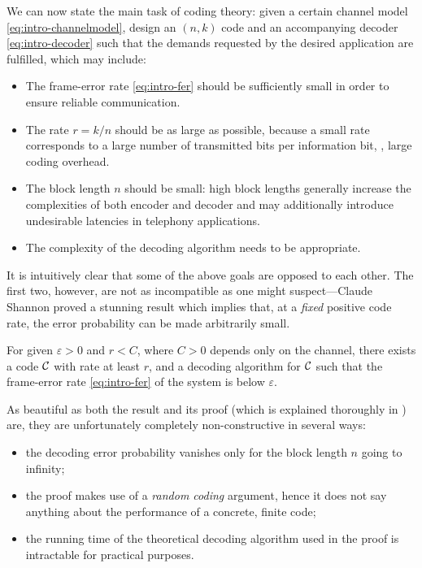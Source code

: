 We can now state the main task of coding theory: given a certain channel model \cref{eq:intro-channelmodel}, design an $(n, k)$ code and an accompanying decoder \cref{eq:intro-decoder} such that the demands requested by the desired application are fulfilled, which may include:
\begin{itemize}
  \item The frame-error rate \cref{eq:intro-fer} should be sufficiently small in order to ensure reliable communication.
  \item The rate $r = k/n$ should be as large as possible, because a small rate corresponds to a large number of transmitted bits per information bit, \ie, large coding overhead.
  \item The block length $n$ should be small: high block lengths generally increase the complexities of both encoder and decoder and may additionally introduce undesirable latencies in \eg telephony applications.
  \item The complexity of the decoding algorithm needs to be appropriate.
\end{itemize}

It is intuitively clear that some of the above goals are opposed to each other. The first two, however, are not as incompatible as one might suspect—Claude Shannon proved a stunning result \cite{Shannon48} which implies that, at a \emph{fixed} positive code rate, the error probability can be made arbitrarily small.
\begin{theorem}
  \label{thm:intro-noisychannel}
  For given $ε>0$ and $r < C$, where $C > 0$ depends only on the channel, there exists a code $\mathcal{C}$ with rate at least $r$, and a decoding algorithm for $\mathcal{C}$ such that the frame-error rate \cref{eq:intro-fer} of the system is below $ε$.
\end{theorem}
As beautiful as both the result and its proof (which is explained thoroughly in \cite{MacKay03InformationTheory}) are, they are unfortunately completely non-constructive in several ways:
\begin{itemize}
  \item the decoding error probability vanishes only for the block length $n$ going to infinity;
  \item the proof makes use of a \emph{random coding} argument, hence it does not say anything about the performance of a concrete, finite code;
  \item the running time of the theoretical decoding algorithm used in the proof is intractable for practical purposes.
\end{itemize}


